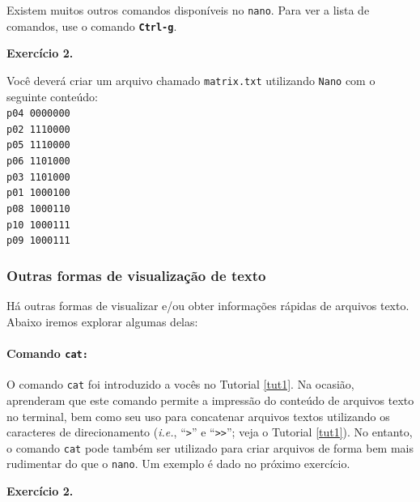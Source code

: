 \begin{refsection}
Existem muitos outros comandos disponíveis no \texttt{nano}. Para ver a lista de comandos, use o comando \textbf{\texttt{Ctrl-g}}.\\

\begin{blackBlock}{\textbf{Exercício 2.}}\label{tut2:ex:2.\arabic{ex}}

Você deverá criar um arquivo chamado \texttt{matrix.txt} utilizando \texttt{Nano} com o seguinte conteúdo:\\

\texttt{p04 0000000}\\
\texttt{p02 1110000}\\
\texttt{p05 1110000}\\
\texttt{p06 1101000}\\
\texttt{p03 1101000}\\
\texttt{p01 1000100}\\
\texttt{p08 1000110}\\
\texttt{p10 1000111}\\
\texttt{p09 1000111}\\

\end{blackBlock}

\subsubsection{Outras formas de visualização de texto}\label{tut2:text:editors:texttools}

Há outras formas de visualizar e/ou obter informações rápidas de arquivos texto. Abaixo iremos explorar algumas delas:\\
\paragraph{Comando \texttt{cat:}}\label{tut2:text:editors:texttools:cat}
O comando \texttt{cat} foi introduzido a vocês no Tutorial \ref{tut1}. Na ocasião, aprenderam que este comando permite a impressão do conteúdo de arquivos texto no terminal, bem como seu uso para concatenar arquivos textos utilizando os caracteres de direcionamento (\textit{i.e.}, ``\texttt{>}'' e ``\texttt{>>}''; veja o Tutorial \ref{tut1}). No entanto, o comando \texttt{cat} pode também ser utilizado para criar arquivos de forma bem mais rudimentar do que o \texttt{nano}. Um exemplo é dado no próximo exercício.\\

\begin{blackBlock}{\textbf{Exercício 2.}}\label{tut2:ex:2.\arabic{ex}}


\end{blackBlock}
\end{refsection}
